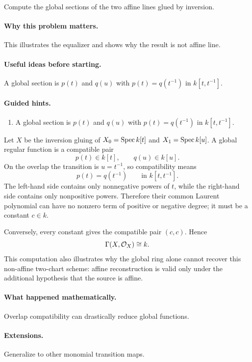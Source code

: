 \begin{problem}\label{prob:vi20-p09}
Compute the global sections of the two affine lines glued by inversion.
\end{problem}

\ifdefined\FullProblemDossiers
\paragraph{Why this problem matters.}
This illustrates the equalizer and shows why the result is not affine line.

\paragraph{Useful ideas before starting.}
A global section is $p(t)$ and $q(u)$ with $p(t)=q(t^{-1})$ in $k[t,t^{-1}]$.

\paragraph{Guided hints.}
\begin{enumerate}
\item A global section is $p(t)$ and $q(u)$ with $p(t)=q(t^{-1})$ in $k[t,t^{-1}]$.
\end{enumerate}

\begin{solution}
Let $X$ be the inversion gluing of $X_0=\operatorname{Spec} k[t]$ and $X_1=\operatorname{Spec} k[u]$.  A global regular function is a compatible pair
\[
p(t)\in k[t],\qquad q(u)\in k[u].
\]
On the overlap the transition is $u=t^{-1}$, so compatibility means
\[
p(t)=q(t^{-1})\qquad\text{in }k[t,t^{-1}].
\]
The left-hand side contains only nonnegative powers of $t$, while the right-hand side contains only nonpositive powers.  Therefore their common Laurent polynomial can have no nonzero term of positive or negative degree; it must be a constant $c\in k$.

Conversely, every constant gives the compatible pair $(c,c)$.  Hence
\[
\Gamma(X,\mathcal O_X)\cong k.
\]
This computation also illustrates why the global ring alone cannot recover this non-affine two-chart scheme: affine reconstruction is valid only under the additional hypothesis that the source is affine.
\end{solution}


\paragraph{What happened mathematically.}
Overlap compatibility can drastically reduce global functions.

\paragraph{Extensions.}
Generalize to other monomial transition maps.
\fi

